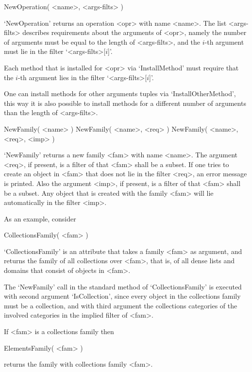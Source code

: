 \>NewOperation( <name>, <args-filts> )

`NewOperation' returns an operation <opr> with name <name>.
The list <args-filts> describes requirements about the arguments
of <opr>, namely the number of arguments must be equal to the length of
<args-filts>, and the $i$-th argument must lie in the filter
`<args-filts>[$i$]'.

Each method that is installed for <opr> via `InstallMethod' must require
that the $i$-th argument lies in the filter `<args-filts>[$i$]'.

One can install methods for other arguments tuples via
`InstallOtherMethod',
this way it is also possible to install methods for a different number
of arguments than the length of <args-filts>.



\>NewFamily( <name> )
\>NewFamily( <name>, <req> )
\>NewFamily( <name>, <req>, <imp> )

`NewFamily' returns a new family <fam> with name <name>.
The argument <req>, if present, is a filter of that <fam> shall be a
subset.
If one tries to create an object in <fam> that does not lie in the filter
<req>, an error message is printed.
Also the argument <imp>, if present, is a filter of that <fam> shall be a
subset.
Any object that is created with the family <fam> will lie automatically
in the filter <imp>.

As an example, consider

\>CollectionsFamily( <fam> )

`CollectionsFamily' is an attribute that takes a family <fam> as
argument, and returns the family of all collections over <fam>,
that is, of all dense lists and domains that consist of objects in
<fam>.

The `NewFamily' call in the standard method of `CollectionsFamily'
is executed with second argument `IsCollection',
since every object in the collections family must be a collection,
and with third argument the collections categories of the involved
categories in the implied filter of <fam>.

If <fam> is a collections family then

\>ElementsFamily( <fam> )

returns the family with collections family <fam>.




